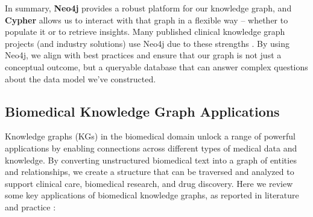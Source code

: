 In summary, \textbf{Neo4j} provides a robust platform for our knowledge graph, and \textbf{Cypher} allows us to interact with that graph in a flexible way – whether to populate it or to retrieve insights. Many published clinical knowledge graph projects (and industry solutions) use Neo4j due to these strengths \parencite{Zimbres2024}. By using Neo4j, we align with best practices and ensure that our graph is not just a conceptual outcome, but a queryable database that can answer complex questions about the data model we've constructed.

\subsection{Biomedical Knowledge Graph Applications}

Knowledge graphs (KGs) in the biomedical domain unlock a range of powerful applications by enabling connections across different types of medical data and knowledge. By converting unstructured biomedical text into a graph of entities and relationships, we create a structure that can be traversed and analyzed to support clinical care, biomedical research, and drug discovery. Here we review some key applications of biomedical knowledge graphs, as reported in literature and practice \parencite{Milvus2025}:

